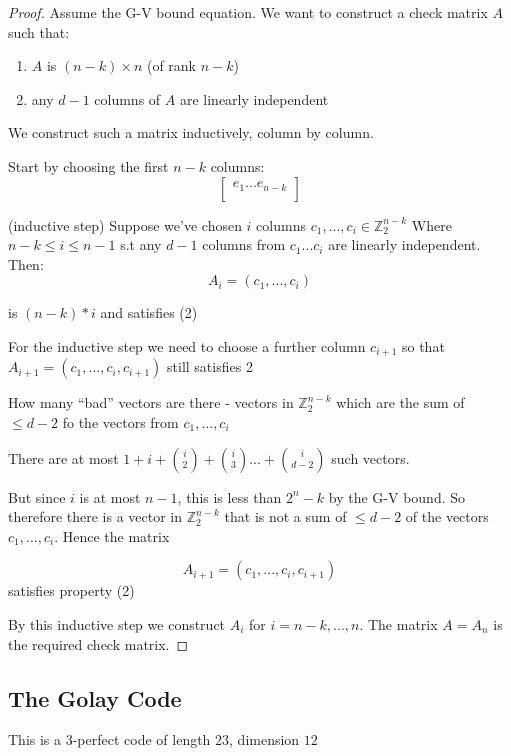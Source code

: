 \documentclass[amsfonts]{amsart}
\theoremstyle{definition}
\theoremstyle{remark}
\numberwithin{equation}{section}
\begin{document}
\begin{proof}
	Assume the G-V bound equation. We want to construct a check matrix $A$ such that:\tabularnewline
	\begin{enumerate}
		\item $A$ is $(n-k) \times n$ (of rank $n-k$)
		\item any $d-1$ columns of $A$ are linearly independent
	\end{enumerate}
	We construct such a matrix inductively, column by column.

	Start by choosing the first $n-k$ columns:
	\[
		\begin{bmatrix}
		e_1 ... e_{n-k}\\
		\end{bmatrix}
	\]

	(inductive step)
	Suppose we've chosen $i$ columns $c_1, ..., c_i \in \mathbb{Z}_2^{n-k}$ \tabularnewline
	Where $n-k \leq i \leq n-1$ s.t any $d-1$ columns from $c_1 ... c_i$ are linearly independent. \tabularnewline
	Then:
	\[
		A_i = (c_1, ... , c_i)
	\]

	is $(n-k)*i$ and satisfies (2)

	For the inductive step we need to choose a further column $c_{i+1}$ so that $A_{i+1} = (c_1, ..., c_i, c_{i+1})$ still satisfies 2

	How many ``bad'' vectors are there - vectors in $\mathbb{Z}_2^{n-k}$ which are the sum of $\leq d-2$ fo the vectors from $c_1, ... , c_i$

	There are at most $1 + i  + {i \choose 2} + {i \choose 3} ... + {i \choose d-2}$ such vectors.

	But since $i$ is at most $n-1$, this is less than $2^n-k$ by the G-V bound. So therefore there is a vector in $\mathbb{Z}_2^{n-k}$ that is not a sum of $\leq d-2$ of the vectors $c_1, ..., c_i$. Hence the matrix

	\[
		A_{i+1} = (c_1, ..., c_i, c_{i+1})
	\]
	satisfies property (2)

	By this inductive step we construct $A_i$ for $i = n-k, ..., n$. The matrix $A = A_n$ is the required check matrix.	
\end{proof}

\subsection{The Golay Code}
This is a 3-perfect code of length $23$, dimension $12$
\end{document}

